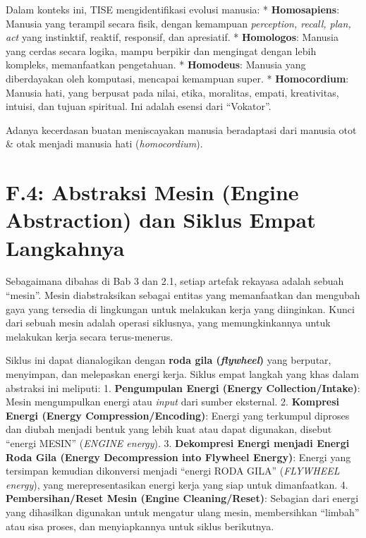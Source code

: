 \documentclass[
  letterpaper,
  DIV=11,
  numbers=noendperiod]{scrreprt}
\begin{document}
Dalam konteks ini, TISE mengidentifikasi evolusi manusia: *
\textbf{Homosapiens}: Manusia yang terampil secara fisik, dengan
kemampuan \emph{perception, recall, plan, act} yang instinktif, reaktif,
responsif, dan apresiatif. * \textbf{Homologos}: Manusia yang cerdas
secara logika, mampu berpikir dan mengingat dengan lebih kompleks,
memanfaatkan pengetahuan. * \textbf{Homodeus}: Manusia yang diberdayakan
oleh komputasi, mencapai kemampuan super. * \textbf{Homocordium}:
Manusia hati, yang berpusat pada nilai, etika, moralitas, empati,
kreativitas, intuisi, dan tujuan spiritual. Ini adalah esensi dari
``Vokator''.

Adanya kecerdasan buatan meniscayakan manusia beradaptasi dari manusia
otot \& otak menjadi manusia hati (\emph{homocordium}).

\section{\texorpdfstring{\textbf{F.4: Abstraksi Mesin (Engine
Abstraction) dan Siklus Empat
Langkahnya}}{F.4: Abstraksi Mesin (Engine Abstraction) dan Siklus Empat Langkahnya}}\label{f.4-abstraksi-mesin-engine-abstraction-dan-siklus-empat-langkahnya}

Sebagaimana dibahas di Bab 3 dan 2.1, setiap artefak rekayasa adalah
sebuah ``mesin''. Mesin diabstraksikan sebagai entitas yang memanfaatkan
dan mengubah gaya yang tersedia di lingkungan untuk melakukan kerja yang
diinginkan. Kunci dari sebuah mesin adalah operasi siklusnya, yang
memungkinkannya untuk melakukan kerja secara terus-menerus.

Siklus ini dapat dianalogikan dengan \textbf{roda gila
(\emph{flywheel})} yang berputar, menyimpan, dan melepaskan energi
kerja. Siklus empat langkah yang khas dalam abstraksi ini meliputi: 1.
\textbf{Pengumpulan Energi (Energy Collection/Intake)}: Mesin
mengumpulkan energi atau \emph{input} dari sumber eksternal. 2.
\textbf{Kompresi Energi (Energy Compression/Encoding)}: Energi yang
terkumpul diproses dan diubah menjadi bentuk yang lebih kuat atau dapat
digunakan, disebut ``energi MESIN'' (\emph{ENGINE energy}). 3.
\textbf{Dekompresi Energi menjadi Energi Roda Gila (Energy Decompression
into Flywheel Energy)}: Energi yang tersimpan kemudian dikonversi
menjadi ``energi RODA GILA'' (\emph{FLYWHEEL energy}), yang
merepresentasikan energi kerja yang siap untuk dimanfaatkan. 4.
\textbf{Pembersihan/Reset Mesin (Engine Cleaning/Reset)}: Sebagian dari
energi yang dihasilkan digunakan untuk mengatur ulang mesin,
membersihkan ``limbah'' atau sisa proses, dan menyiapkannya untuk siklus
berikutnya.
\end{document}
